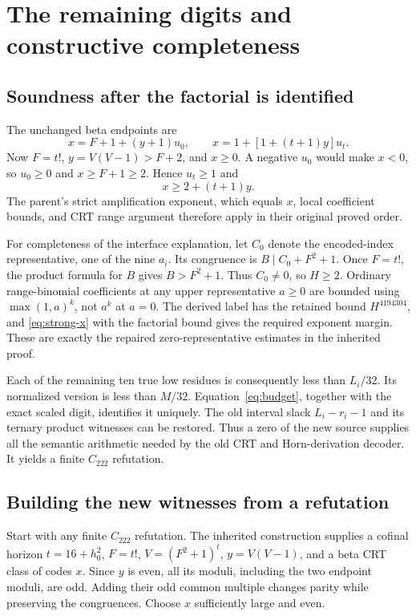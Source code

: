 \documentclass[11pt,letterpaper]{article}
\theoremstyle{remark}\newtheorem{remark}[theorem]{Remark}
\begin{document}
\section{The remaining digits and constructive completeness}
\label{sec:completeness}
\subsection{Soundness after the factorial is identified}
The unchanged beta endpoints are
\[
 x=F+1+(y+1)u_0,\qquad x=1+[1+(t+1)y]u_t.
\]
Now $F=t!$, $y=V(V-1)>F+2$, and $x\ge0$. A negative $u_0$ would make $x<0$, so $u_0\ge0$ and $x\ge F+1\ge2$. Hence $u_t\ge1$ and
\begin{equation}\label{eq:strong-x}
 x\ge2+(t+1)y.
\end{equation}
The parent's strict amplification exponent, which equals $x$, local coefficient bounds, and CRT range argument therefore apply in their original proved order.

For completeness of the interface explanation, let $C_0$ denote the encoded-index representative, one of the nine $a_i$. Its congruence is $B\mid C_0+F^2+1$. Once $F=t!$, the product formula for $B$ gives $B>F^2+1$. Thus $C_0\ne0$, so $H\ge2$. Ordinary range-binomial coefficients at any upper representative $a\ge0$ are bounded using $\max(1,a)^k$, not $a^k$ at $a=0$. The derived label has the retained bound $H^{4194304}$, and \eqref{eq:strong-x} with the factorial bound gives the required exponent margin. These are exactly the repaired zero-representative estimates in the inherited proof.

Each of the remaining ten true low residues is consequently less than $L_i/32$. Its normalized version is less than $M/32$. Equation~\eqref{eq:budget}, together with the exact scaled digit, identifies it uniquely. The old interval slack $L_i-r_i-1$ and its ternary product witnesses can be restored. Thus a zero of the new source supplies all the semantic arithmetic needed by the old CRT and Horn-derivation decoder. It yields a finite $C_{222}$ refutation.

\subsection{Building the new witnesses from a refutation}
Start with any finite $C_{222}$ refutation. The inherited construction supplies a cofinal horizon $t=16+h_0^2$, $F=t!$, $V=(F^2+1)^t$, $y=V(V-1)$, and a beta CRT class of codes $x$. Since $y$ is even, all its moduli, including the two endpoint moduli, are odd. Adding their odd common multiple changes parity while preserving the congruences. Choose $x$ sufficiently large and even.
\end{document}
